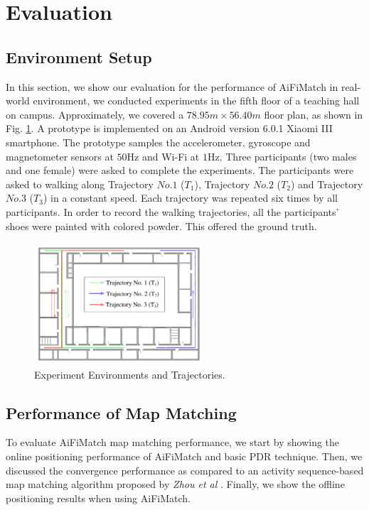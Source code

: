 \documentclass[conference]{IEEEtran}
\begin{document}
\section{Evaluation}

\subsection{Environment Setup}

In this section, we show our evaluation for the performance of AiFiMatch in real-world environment, we conducted experiments in the fifth floor of a teaching hall on campus. Approximately, we covered a $78.95m \times 56.40m$ floor plan, as shown in Fig. \ref{fig-envionment}. A prototype is implemented on an Android version 6.0.1 Xiaomi III smartphone. The prototype samples the accelerometer, gyroscope and magnetometer sensors at $50$Hz and Wi-Fi at $1$Hz. Three participants (two males and one female) were asked to complete the experiments. The participants were asked to walking along Trajectory $No.1$ ($T_1$), Trajectory $No.2$ ($T_2$) and Trajectory $No.3$ ($T_3$) in a constant speed. Each trajectory was repeated six times by all participants. In order to record the walking trajectories, all the participants' shoes were painted with colored powder. This offered the ground truth.

\begin{figure}[!htbp]
	\centering
	\includegraphics[width=2.48in]{AiFiMatch-Environment}
	\caption{Experiment Environments and Trajectories.}
	\label{fig-envionment}
\end{figure}

\subsection{Performance of Map Matching}

To evaluate AiFiMatch map matching performance, we start by showing the online positioning performance of AiFiMatch and basic PDR technique. Then, we discussed the convergence performance as compared to an activity sequence-based map matching algorithm proposed by \emph{Zhou et al} \cite{zhou2015activity}. Finally, we show the offline positioning results when using AiFiMatch.
\end{document}
